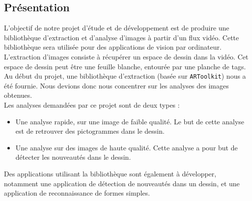 \subsection{Présentation}

L'objectif de notre projet d'étude et de développement est de produire une bibliothèque d'extraction et d'analyse d'images à partir d'un flux vidéo. Cette bibliothèque sera utilisée pour des applications de vision par ordinateur.\\

L'extraction d'images consiste à récupérer un espace de dessin dans la vidéo. Cet espace de dessin peut être une feuille blanche, entourée par une planche de tags. Au début du projet, une bibliothèque d'extraction (basée sur \texttt{ARToolkit}) nous a été fournie. Nous devions donc nous concentrer sur les analyses des images obtenues.\\

Les analyses demandées par ce projet sont de deux types : 
\begin{itemize}
\item Une analyse rapide, sur une image de faible qualité. Le but de cette analyse est de retrouver des pictogrammes dans le dessin.
\item Une analyse sur des images de haute qualité. Cette analyse a pour but de détecter les nouveautés dans le dessin.\\
\end{itemize}
Des applications utilisant la bibliothèque sont également à développer, notamment une application de détection de nouveautés dans un dessin, et une application de reconnaissance de formes simples.